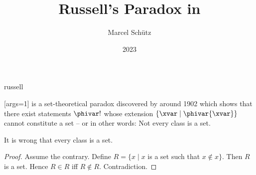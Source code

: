 \documentclass{stex}
\begin{document}
\title{Russell's Paradox in \Naproche}
\author{Marcel Schütz}
\date{2023}
\maketitle
\begin{smodule}{russell}
\begin{sparagraph}
  [args=1]{\maincomp{\varphi}}
  \noindent \emph{} is a set-theoretical paradox discovered by  around 1902 \cite[chapter XV]{Frege1980} which shows that there exist statements $\phivar!$ whose extension $\{\xvar\mid\phivar{\xvar}\}$ cannot constitute a set – or in other words: Not every class is a set.
\end{sparagraph}

\begin{forthel}

  \begin{theorem*}\label{russell_paradox}
    It is wrong that every class is a set.
  \end{theorem*}
  \begin{proof}
    Assume the contrary.
    Define $R = \{ x \mid x$ is a set such that $x \notin x \}$.
    Then $R$ is a set.
    Hence $R \in R$ iff $R \notin R$.
    Contradiction.
  \end{proof}
\end{forthel}
\end{smodule}
\printbibliography
\end{document}
